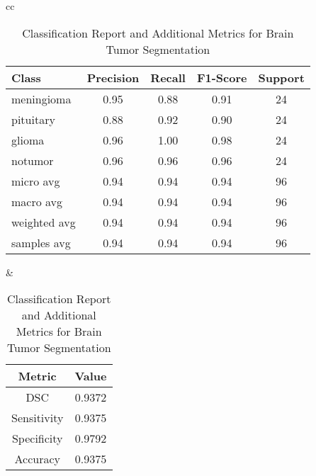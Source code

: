 \begin{table}[ht]
\centering
\begin{tabular}{cc}
    \begin{minipage}{.6\linewidth}
        \centering
        \begin{subtable}[t]{\linewidth}
            \centering
            \begin{tabular}{|l|c|c|c|c|}
                \hline 
                \textbf{Class} & \textbf{Precision} & \textbf{Recall} & \textbf{F1-Score} & \textbf{Support} \\ 
                \hline 
                meningioma & 0.95 & 0.88 & 0.91 & 24 \\ 
                \hline
                pituitary  & 0.88 & 0.92 & 0.90 & 24 \\ 
                \hline
                glioma     & 0.96 & 1.00 & 0.98 & 24 \\ 
                \hline
                notumor    & 0.96 & 0.96 & 0.96 & 24 \\ 
                \hline
                micro avg  & 0.94 & 0.94 & 0.94 & 96 \\ 
                \hline
                macro avg  & 0.94 & 0.94 & 0.94 & 96 \\ 
                \hline
                weighted avg & 0.94 & 0.94 & 0.94 & 96 \\ 
                \hline
                samples avg & 0.94 & 0.94 & 0.94 & 96 \\ 
                \hline
            \end{tabular}
            \caption{Classification Report for Brain Tumor Segmentation} 
            \label{tab:unet_classification_report}
        \end{subtable}
    \end{minipage} &
    \begin{minipage}{.35\linewidth}
        \centering
        \begin{subtable}[t]{\linewidth}
            \centering
            \begin{tabular}{|c|c|}
                \hline 
                \textbf{Metric} & \textbf{Value} \\ 
                \hline
                DSC & 0.9372 \\ 
                \hline
                Sensitivity & 0.9375 \\ 
                \hline
                Specificity & 0.9792 \\ 
                \hline
                Accuracy & 0.9375 \\ 
                \hline
            \end{tabular}
            \caption{Additional Metrics for Brain Tumor Segmentation} 
            \label{tab:unet_additional_metrics}
        \end{subtable}
    \end{minipage}
\end{tabular}
\caption{Classification Report and Additional Metrics for Brain Tumor Segmentation}
\label{tab:combined_metrics}
\end{table}


